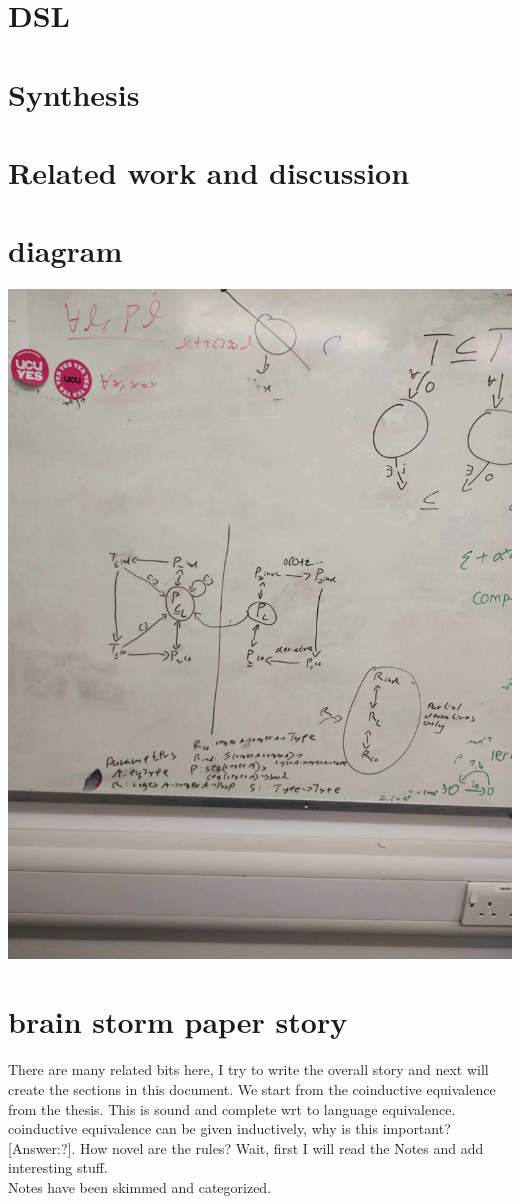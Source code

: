 \section{DSL}

\section{Synthesis}
\section{Related work and discussion}


\section{diagram}
\includegraphics[width=\linewidth]{imgs/diagram.jpg}

\section{brain storm paper story}
There are many related bits here, I try to write the overall story and next will create the sections in this document.
We start from the coinductive equivalence from the thesis. This is sound and complete wrt to language equivalence. coinductive equivalence can be given inductively, why is this important? [Answer:?]. How novel are the rules?
Wait, first I will read the Notes and add interesting stuff.\\
Notes have been skimmed and categorized.\\




